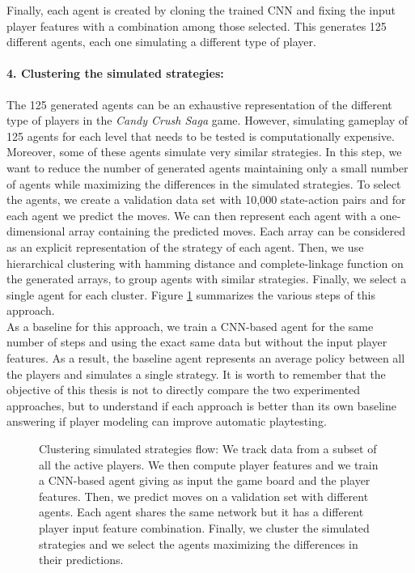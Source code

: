 Finally, each agent is created by cloning the trained \acs{CNN} and fixing the input player features with a combination among those selected. This generates 125 different agents, each one simulating a different type of player.

\paragraph{4. Clustering the simulated strategies:}
The 125 generated agents can be an exhaustive representation of the different type of players in the \textit{Candy Crush Saga} game. However, simulating gameplay of 125 agents for each level that needs to be tested is computationally expensive. Moreover, some of these agents simulate very similar strategies. In this step, we want to reduce the number of generated agents maintaining only a small number of agents while maximizing the differences in the simulated strategies. To select the agents, we create a validation data set with 10,000 state-action pairs and for each agent we predict the moves. We can then represent each agent with a one-dimensional array containing the predicted moves. Each array can be considered as an explicit representation of the strategy of each agent. Then, we use hierarchical clustering with hamming distance and complete-linkage function on the generated arrays, to group agents with similar strategies. Finally, we select a single agent for each cluster. Figure \ref{fig:clustering_simulated_strategies_flow} summarizes the various steps of this approach. \\

As a baseline for this approach, we train a \acs{CNN}-based agent for the same number of steps and using the exact same data but without the input player features. As a result, the baseline agent represents an average policy between all the players and simulates a single strategy. It is worth to remember that the objective of this thesis is not to directly compare the two experimented approaches, but to understand if each approach is better than its own baseline answering if player modeling can improve automatic playtesting.
 

\begin{figure}[ht!]
    \centering
    
    \caption{Clustering simulated strategies flow: We track data from a subset of all the active players. We then compute player features and we train a \acs{CNN}-based agent giving as input the game board and the player features. Then, we predict moves on a validation set with different agents. Each agent shares the same network but it has a different player input feature combination. Finally, we cluster the simulated strategies and we select the agents maximizing the differences in their predictions.}
    \label{fig:clustering_simulated_strategies_flow}
\end{figure}


